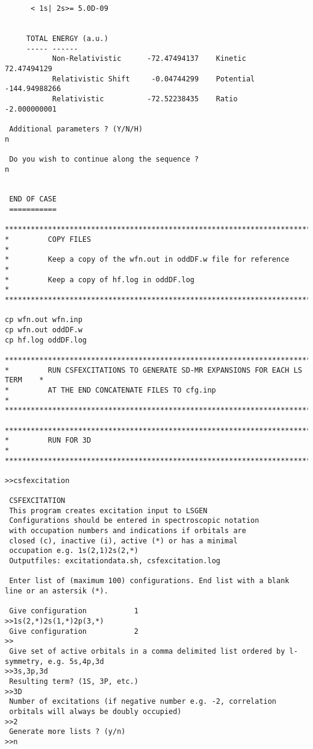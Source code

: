 \documentclass[fleqn,10pt]{book}
\begin{document}
\begin{verbatim}
      < 1s| 2s>= 5.0D-09


     TOTAL ENERGY (a.u.)
     ----- ------
           Non-Relativistic      -72.47494137    Kinetic       72.47494129
           Relativistic Shift     -0.04744299    Potential   -144.94988266
           Relativistic          -72.52238435    Ratio        -2.000000001

 Additional parameters ? (Y/N/H) 
n

 Do you wish to continue along the sequence ? 
n


 END OF CASE
 ===========
 
*******************************************************************************
*         COPY FILES                                                          *
*         Keep a copy of the wfn.out in oddDF.w file for reference            *
*         Keep a copy of hf.log in oddDF.log                                  *
*******************************************************************************

cp wfn.out wfn.inp
cp wfn.out oddDF.w
cp hf.log oddDF.log

*******************************************************************************
*         RUN CSFEXCITATIONS TO GENERATE SD-MR EXPANSIONS FOR EACH LS TERM    *
*         AT THE END CONCATENATE FILES TO cfg.inp                             *
*******************************************************************************

*******************************************************************************
*         RUN FOR 3D                                                          *
*******************************************************************************

>>csfexcitation

 CSFEXCITATION
 This program creates excitation input to LSGEN
 Configurations should be entered in spectroscopic notation
 with occupation numbers and indications if orbitals are
 closed (c), inactive (i), active (*) or has a minimal
 occupation e.g. 1s(2,1)2s(2,*)
 Outputfiles: excitationdata.sh, csfexcitation.log

 Enter list of (maximum 100) configurations. End list with a blank line or an astersik (*).

 Give configuration           1
>>1s(2,*)2s(1,*)2p(3,*)
 Give configuration           2
>>
 Give set of active orbitals in a comma delimited list ordered by l-symmetry, e.g. 5s,4p,3d
>>3s,3p,3d
 Resulting term? (1S, 3P, etc.)
>>3D
 Number of excitations (if negative number e.g. -2, correlation 
 orbitals will always be doubly occupied)                        
>>2
 Generate more lists ? (y/n)
>>n


\end{verbatim}
\end{document}
